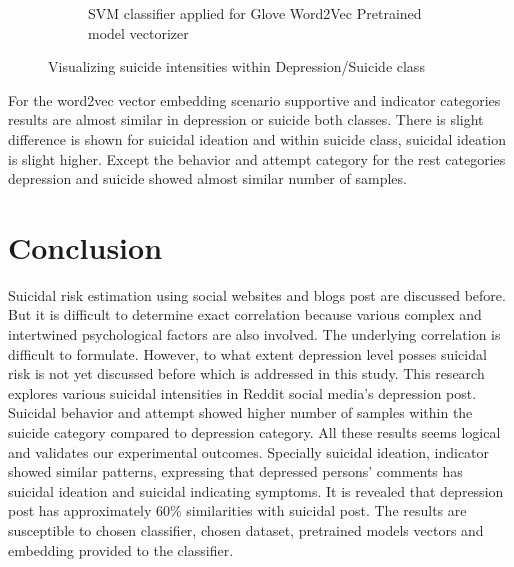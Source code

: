 \documentclass[sn-mathphys,Numbered]{sn-jnl}%
\theoremstyle{thmstyleone}%
\theoremstyle{thmstyletwo}%
\theoremstyle{thmstylethree}%
\begin{document}
\begin{figure}[H]
\begin{subfigure}{0.45\textwidth}
    \caption{SVM classifier applied for Glove Word2Vec Pretrained model vectorizer}
    \label{GloveWord2Vec}
\end{subfigure}        
\caption{Visualizing suicide intensities within Depression/Suicide class}
\label{Suicidal_int_vis} 
\end{figure}
For the word2vec vector embedding scenario supportive and indicator categories results are almost similar in depression or suicide both classes. There is slight difference is shown for suicidal ideation and within suicide class, suicidal ideation is slight higher. Except the behavior and attempt category for the rest categories depression and suicide showed almost similar number of samples. 
%        
\section{Conclusion} 
\label{conclu}
Suicidal risk estimation using social websites and blogs post are discussed before. But it is difficult to determine exact correlation because various complex and intertwined psychological factors are also involved. The underlying correlation is difficult to formulate. However, to what extent depression level posses suicidal risk is not yet discussed before which is addressed in this study. This research explores various suicidal intensities in Reddit social media's depression post. Suicidal behavior and attempt showed higher number of samples within the suicide category compared to depression category. All these results seems logical and validates our experimental outcomes. Specially suicidal ideation, indicator showed similar patterns, expressing that depressed persons' comments has suicidal ideation and suicidal indicating symptoms. It is revealed that depression post has approximately 60\% similarities with suicidal post. The results are susceptible to chosen classifier, chosen dataset, pretrained models vectors and embedding provided to the classifier. 
\noindent

\end{document}
